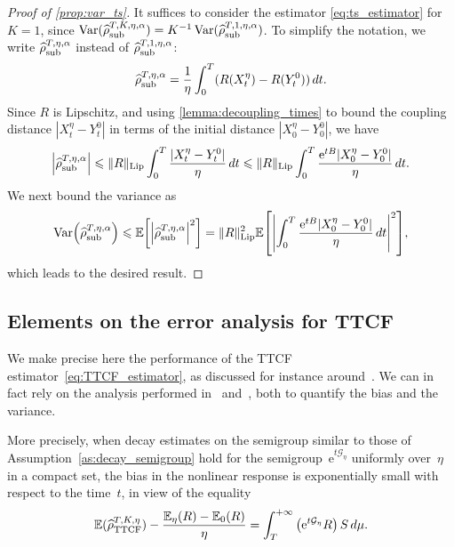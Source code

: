 \documentclass[11pt]{article}
\newcommand{\E}{\mathbb{E}}
\newcommand{\e}{\mathrm{e}}
\renewcommand{\leq}{\leqslant}
\DeclareMathOperator{\Var}{Var}
\DeclarePairedDelimiter\abs{\lvert}{\rvert}
\DeclarePairedDelimiter\paren{\lparen}{\rparen}
\DeclarePairedDelimiter\bkt{\lbrack}{\rbrack}
\theoremstyle{definition}
\newcommand{\G}{\mathcal{G}}
\newcommand{\TestTTCF}{\estTmp^{T,K,\eta}_{\rm TTCF}}
\newcommand{\RLip}{\|R\|_{\rm Lip}}
\newcommand{\estTmp}{\widehat{\rho}}
\newcommand{\asTSest}{\estTmp^{T,\eta,\alpha}_{\rm sub}} %
\newcommand{\aTSest}{\estTmp^{T,K,\eta,\alpha}_{\rm sub}} %
\begin{document}
\begin{proof}[Proof of \cref{prop:var_ts}]
It suffices to consider the estimator \eqref{eq:ts_estimator} for $K=1$, since $\Var(\aTSest) = K^{-1}\Var(\widehat{\rho}^{T,1,\eta,\alpha}_{\rm sub})$. To simplify the notation, we write $\asTSest$ instead of $\widehat{\rho}^{T,1,\eta,\alpha}_{\rm sub}$:
\begin{equation}
		\asTSest = \frac{1}{\eta}\int_0^T (R(X_t^\eta) - R(Y_t^0)) \, dt.
	\end{equation}
Since $R$ is Lipschitz, and using \cref{lemma:decoupling_times} to bound the coupling distance $|X_t^\eta - Y_t^0|$ in terms of the initial distance $|X_0^\eta - Y_0^0|$, we have
\begin{align}
		\label{eq:rhoLipschitz}
		\abs*{\asTSest} \leq \RLip \int_0^T \frac{|X_t^\eta - Y_t^0|}{\eta} \, dt \leq \RLip \int_0^T \frac{\e^{tB}|X_0^\eta - Y_0^0|}{\eta} \, dt.
\end{align}
We next bound the variance as
\begin{align}
		\Var\paren*{\asTSest} 
\leq \E\bkt*{\abs*{\asTSest}^2} = \RLip^2\E\bkt*{\abs*{\int_0^T \frac{\e^{tB}|X_0^\eta - Y_0^0|}{\eta} \, dt}^2},
		\label{eq:var_integral_bound}
	\end{align}
which leads to the desired result.
\end{proof}

\subsection{Elements on the error analysis for TTCF}
\label{sec:error_TTCF}

We make precise here the performance of the TTCF estimator~\eqref{eq:TTCF_estimator}, as discussed for instance around~\cite[Eqs.~(16) and~(17)]{maffioli2024}. We can in fact rely on the analysis performed in~\cite{pavliotis2024} and~\cite[Propositions~2.2 and~2.3]{pavliotis2024}, both to quantify the bias and the variance.

More precisely, when decay estimates on the semigroup similar to those of Assumption~\ref{as:decay_semigroup} hold for the semigroup~$\e^{t \G_\eta}$ uniformly over~$\eta$ in a compact set, the bias in the nonlinear response is exponentially small with respect to the time~$t$, in view of the equality
\begin{equation}
  \label{eq:bias_TTCF}
  \E(\TestTTCF) - \frac{\E_\eta(R)-\E_0(R)}{\eta} = \int_T^{+\infty} \left(\e^{t\G_\eta} R \right) S \, d\mu.
\end{equation}
\end{document}
